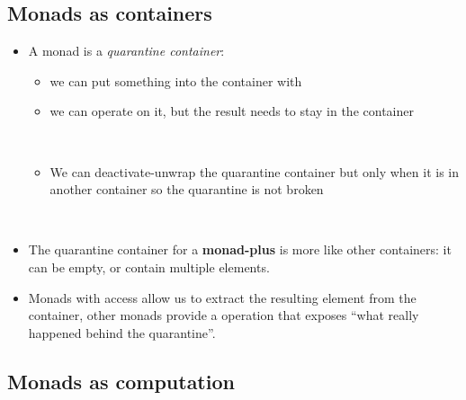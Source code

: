 \documentclass{beamer}
\newcommand{\tmem}[1]{{\em #1\/}}
\newcommand{\tmstrong}[1]{\textbf{#1}}
\newcommand{\tmverbatim}[1]{\text{{\ttfamily{#1}}}}
\begin{document}
\subsection{Monads as containers}

\begin{itemize}
  \item A monad is a {\tmem{quarantine container}}:
  \begin{itemize}
    \item we can put something into the container with \tmverbatim{return}
    
    \item we can operate on it, but the result needs to stay in the container
    
    {\hlstd{ \ }}{}{}{\hlopt{= }}{}{}{\hlopt{<-- }}{}{\hlopt{; }}{}{\hlopt{(}}{}{\hlopt{)}}{\hlendline{}}\\
    {}{}{\hlopt{: (}}{}{\hlopt{->
    }}{}{\hlopt{) -> }}{}{\hlopt{ }}{}{\hlopt{-> }}{}{}
    
    \item We can deactivate-unwrap the quarantine container but only when it
    is in another container so the quarantine is not broken
    
    {\hlstd{ \ }}{}{}{\hlopt{= }}{}{}{\hlopt{<-- }}{}{\hlopt{;
    }}{}{\hlendline{}}\\
    {\hlstd{ }}{}{}{\hlopt{: (}}{}{\hlopt{
    }}{}{\hlopt{) }}{}{\hlopt{->
    }}{}{}
  \end{itemize}
  \item The quarantine container for a {\tmstrong{monad-plus}} is more like
  other containers: it can be empty, or contain multiple elements.
  
  \item Monads with access allow us to extract the resulting element from the
  container, other monads provide a \tmverbatim{run} operation that exposes
  ``what really happened behind the quarantine''.
\end{itemize}

\subsection{Monads as computation}
\end{document}

